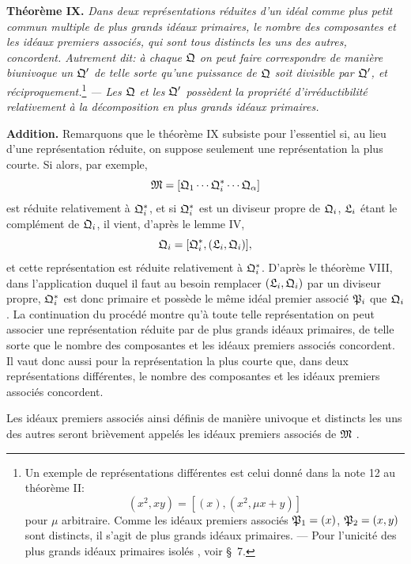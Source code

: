 \textbf{Théorème IX.} \emph{Dans deux représentations réduites d'un idéal comme plus petit commun multiple de plus grands idéaux primaires, le nombre des composantes et les idéaux premiers associés, qui sont tous distincts les uns des autres, concordent. Autrement dit: à chaque $\mathfrak{Q}$ on peut faire correspondre de manière biunivoque un $\mathfrak{Q}'$ de telle sorte qu'une puissance de $\mathfrak{Q}$ soit divisible par $\mathfrak{Q}'$, et réciproquement.}\footnote{Un exemple de représentations différentes est celui donné dans la note 12 au théorème II:
\[
 (x^2,xy)=[(x),(x^2,\mu x+y)]
\]
pour $\mu$ arbitraire. Comme les idéaux premiers associés $\mathfrak{P}_1=(x)$, $\mathfrak{P}_2=(x,y)$ sont distincts, il s'agit de plus grands idéaux primaires. --- Pour l'unicité des plus grands idéaux primaires \og{} isolés \fg{}, voir \S~7.} \emph{--- Les $\mathfrak{Q}$ et les $\mathfrak{Q}'$ possèdent la propriété d'irréductibilité relativement à la décomposition en plus grands idéaux primaires.}

\textbf{Addition.} Remarquons que le théorème IX subsiste pour l'essentiel si, au lieu d'une représentation réduite, on suppose seulement une représentation la plus courte. Si alors, par exemple,
\[
 \mathfrak{M}=[\mathfrak{Q}_1\cdots\mathfrak{Q}_i^*\cdots\mathfrak{Q}_\alpha]
\]
est réduite relativement à $\mathfrak{Q}_i^*$, et si $\mathfrak{Q}_i^*$ est un diviseur propre de $\mathfrak{Q}_i$, $\mathfrak{L}_i$ étant le complément de $\mathfrak{Q}_i$, il vient, d'après le lemme IV,
\[
 \mathfrak{Q}_i=[\mathfrak{Q}_i^*,(\mathfrak{L}_i,\mathfrak{Q}_i)],
\]
et cette représentation est réduite relativement à $\mathfrak{Q}_i^*$. D'après le théorème VIII, dans l'application duquel il faut au besoin remplacer $(\mathfrak{L}_i,\mathfrak{Q}_i)$ par un diviseur propre, $\mathfrak{Q}_i^*$ est donc primaire et possède le même idéal premier associé $\mathfrak{P}_i$ que $\mathfrak{Q}_i$. La continuation du procédé montre qu'à toute telle représentation on peut associer une représentation réduite par de plus grands idéaux primaires, de telle sorte que le nombre des composantes et les idéaux premiers associés concordent. Il vaut donc aussi pour la représentation la plus courte que, dans deux représentations différentes, le nombre des composantes et les idéaux premiers associés concordent.

Les idéaux premiers associés ainsi définis de manière univoque et distincts les uns des autres seront brièvement appelés \og{} les idéaux premiers associés de $\mathfrak{M}$ \fg{}.
